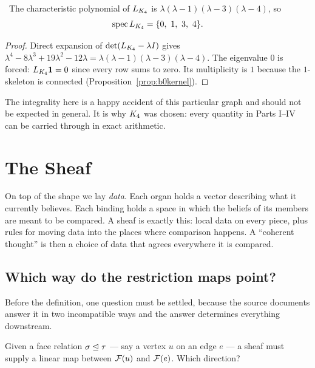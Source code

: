 \begin{proposition}\label{prop:specK4}
\Proved\ The characteristic polynomial of $L_{K_4}$ is
$\lambda(\lambda-1)(\lambda-3)(\lambda-4)$, so
\[
  \operatorname{spec}L_{\Kc_4}=\{0,\ 1,\ 3,\ 4\}.
\]
\end{proposition}
\begin{proof}
Direct expansion of $\det(L_{K_4}-\lambda I)$ gives
$\lambda^4-8\lambda^3+19\lambda^2-12\lambda
 =\lambda(\lambda-1)(\lambda-3)(\lambda-4)$.
The eigenvalue $0$ is forced: $L_{K_4}\mathbf 1=0$ since every row
sums to zero. Its multiplicity is $1$ because the $1$-skeleton is
connected (Proposition~\ref{prop:b0kernel}).
\end{proof}

The integrality here is a happy accident of this particular graph and
should not be expected in general. It is why $K_4$ was chosen: every
quantity in Parts I--IV can be carried through in exact arithmetic.

\chapter{The Sheaf}\label{ch:sheaf}

\begin{intu}\Intu
On top of the shape we lay \emph{data}. Each organ holds a vector
describing what it currently believes. Each binding holds a space in
which the beliefs of its members are meant to be compared. A sheaf is
exactly this: local data on every piece, plus rules for moving data into
the places where comparison happens. A ``coherent thought'' is then a
choice of data that agrees everywhere it is compared.
\end{intu}

\section{Which way do the restriction maps point?}\label{sec:direction}

Before the definition, one question must be settled, because the source
documents answer it in two incompatible ways and the answer determines
everything downstream.

Given a face relation $\sigma\trianglelefteq\tau$ --- say a vertex $u$ on an edge
$e$ --- a sheaf must supply a linear map between $\mathcal{F}(u)$ and
$\mathcal{F}(e)$. Which direction?

